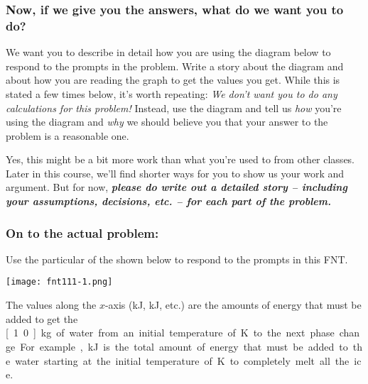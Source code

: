 \subsubsection*{Now, if we give you the answers, what do we want you to do?}

We want you to describe in detail how you are using the diagram below to respond to the prompts in the problem. Write a story about the diagram and about how you are reading the graph to get the values you get. While this is stated a few times below, it's worth repeating: \emph{We don't want you to do any calculations for this problem!} Instead, use the diagram and tell us \emph{how} you're using the diagram and \emph{why} we should believe you that your answer to the problem is a reasonable one.

Yes, this might be a bit more work than what you're used to from other classes. Later in this course, we'll find shorter ways for you to show us your work and argument. But for now, \textbf{\emph{please do write out a detailed story -- including your assumptions, decisions, etc. -- for each part of the problem.}}

\subsubsection*{On to the actual problem:}

Use the particular \TempGraph{} of the \ThreePhaseModel{} shown below to respond to the prompts in this FNT.\\

\noindent
{\centering\texttt{[image: fnt111-1.png]}\par}

\noindent The values along the $x$-axis (\unit[146]{kJ}, \unit[480]{kJ}, etc.) are the amounts of energy that must be added to get the \unit[1.0]{kg} of water from an initial temperature of \unit[200]{K} to the next phase change. For example, \unit[480]{kJ} is the total amount of energy that must be added to the water starting at the initial temperature of \unit[200]{K} to completely melt all the ice.

